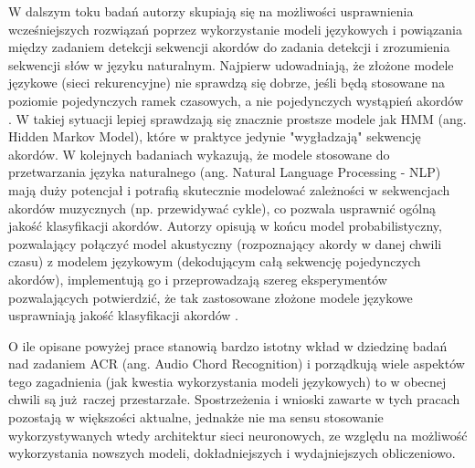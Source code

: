 W dalszym toku badań autorzy skupiają się na możliwości usprawnienia wcześniejszych rozwiązań poprzez wykorzystanie modeli językowych i powiązania między zadaniem detekcji sekwencji akordów do zadania detekcji i zrozumienia sekwencji słów w języku naturalnym. Najpierw udowadniają, że złożone modele językowe (sieci rekurencyjne) nie sprawdzą się dobrze, jeśli będą stosowane na poziomie pojedynczych ramek czasowych, a nie pojedynczych wystąpień akordów \cite{korzeniowski_futility_2017}. W takiej sytuacji lepiej sprawdzają się znacznie prostsze modele jak HMM (ang. Hidden Markov Model), które w praktyce jedynie "wygładzają" sekwencję akordów. W kolejnych badaniach \cite{korzeniowski_large-scale_2018} wykazują, że modele stosowane do przetwarzania języka naturalnego (ang. Natural Language Processing - NLP) mają duży potencjał i potrafią skutecznie modelować zależności w sekwencjach akordów muzycznych (np. przewidywać cykle), co pozwala usprawnić ogólną jakość klasyfikacji akordów. Autorzy opisują w końcu model probabilistyczny, pozwalający połączyć model akustyczny (rozpoznający akordy w danej chwili czasu) z modelem językowym (dekodującym całą sekwencję pojedynczych akordów), implementują go i przeprowadzają szereg eksperymentów pozwalających potwierdzić, że tak zastosowane złożone modele językowe usprawniają jakość klasyfikacji akordów \cite{korzeniowski_improved_2018}.

O ile opisane powyżej prace stanowią bardzo istotny wkład w dziedzinę badań nad zadaniem ACR (ang.  Audio Chord Recognition) i porządkują wiele aspektów tego zagadnienia (jak kwestia wykorzystania modeli językowych) to w obecnej chwili są już raczej przestarzałe. Spostrzeżenia i wnioski zawarte w tych pracach pozostają w większości aktualne, jednakże nie ma sensu stosowanie wykorzystywanych wtedy architektur sieci neuronowych, ze względu na możliwość wykorzystania nowszych modeli, dokładniejszych i wydajniejszych obliczeniowo.


